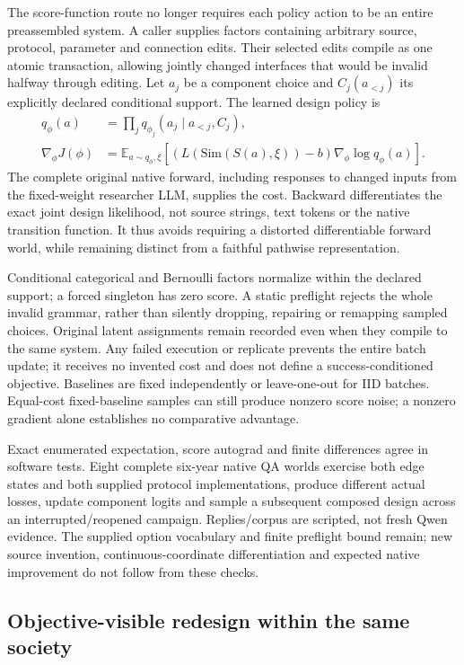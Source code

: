 The score-function route no longer requires each policy action to be an entire
preassembled system. A caller supplies factors containing arbitrary source,
protocol, parameter and connection edits. Their selected edits compile as one
atomic transaction, allowing jointly changed interfaces that would be invalid
halfway through editing. Let $a_j$ be a component choice and $C_j(a_{<j})$ its
explicitly declared conditional support. The learned design policy is
\begin{align}
 q_\phi(a)&=\prod_j q_{\phi_j}(a_j\mid a_{<j},C_j),\\
 \nabla_\phi J(\phi)&=
 \mathbb{E}_{a\sim q_\phi,\xi}
 \left[(L(\mathrm{Sim}(S(a),\xi))-b)\nabla_\phi\log q_\phi(a)\right].
\end{align}
The complete original native forward, including responses to changed inputs
from the fixed-weight researcher LLM, supplies the cost. Backward differentiates
the exact joint design likelihood, not source strings, text tokens or the native
transition function. It thus avoids requiring a distorted differentiable forward
world, while remaining distinct from a faithful pathwise representation.

Conditional categorical and Bernoulli factors normalize within the declared
support; a forced singleton has zero score. A static preflight rejects the whole
invalid grammar, rather than silently dropping, repairing or remapping sampled
choices. Original latent assignments remain recorded even when they compile to
the same system. Any failed execution or replicate prevents the entire batch
update; it receives no invented cost and does not define a success-conditioned
objective. Baselines are fixed independently or leave-one-out for IID batches.
Equal-cost fixed-baseline samples can still produce nonzero score noise; a
nonzero gradient alone establishes no comparative advantage.

Exact enumerated expectation, score autograd and finite differences agree in
software tests. Eight complete six-year native QA worlds exercise both edge
states and both supplied protocol implementations, produce different actual
losses, update component logits and sample a subsequent composed design across
an interrupted/reopened campaign. Replies/corpus are scripted, not fresh Qwen
evidence. The supplied option vocabulary and finite preflight bound remain;
new source invention, continuous-coordinate differentiation and expected
native improvement do not follow from these checks.

\subsection{Objective-visible redesign within the same society}
\label{sec:persistent-session-v6}

